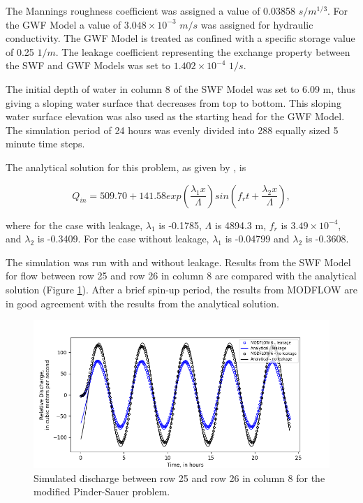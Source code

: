 \documentclass[fleqn]{article}
\begin{document}
The Mannings roughness coefficient was assigned a value of 0.03858 $s/m^{1/3}$.  For the GWF Model a value of $3.048 \times 10^{-3}$ $m/s$ was assigned for hydraulic conductivity. The GWF Model is treated as confined with a specific storage value of 0.25 $1/m$.  The leakage coefficient representing the exchange property between the SWF and GWF Models was set to $1.402 \times 10^{-4}$ $1/s$.

The initial depth of water in column 8 of the SWF Model was set to 6.09 m, thus giving a sloping water surface that decreases from top to bottom.  This sloping water surface elevation was also used as the starting head for the GWF Model.  The simulation period of 24 hours was evenly divided into 288 equally sized 5 minute time steps.  

The analytical solution for this problem, as given by \cite{lal2001}, is

\begin{equation}
  Q_{in} = 509.70 + 141.58 
  exp \left ( \frac{\lambda_1 x}{\Lambda} \right ) 
  sin \left ( f_r t + \frac{\lambda_2 x}{\Lambda}\right ),
\end{equation}

\noindent where for the case with leakage, $\lambda_1$ is -0.1785, $\Lambda$ is 4894.3 m, $f_r$ is $3.49 \times 10^{-4}$, and $\lambda_2$ is -0.3409.  For the case without leakage, $\lambda_1$ is -0.04799 and $\lambda_2$ is -0.3608.

The simulation was run with and without leakage.  Results from the SWF Model for flow between row 25 and row 26 in column 8 are compared with the analytical solution (Figure \ref{fig:pinder-sauer}). After a brief spin-up period, the results from MODFLOW are in good agreement with the results from the analytical solution.

\begin{figure}
	\centering
	\includegraphics[scale=0.50]{figures/pinder-sauer-results.png}
	\caption[Simulated discharge between row 25 and row 26 in column 8 for the modified Pinder-Sauer problem.]{Simulated discharge between row 25 and row 26 in column 8 for the modified Pinder-Sauer problem.}
	\label{fig:pinder-sauer}
\end{figure}


% 

 
\end{document}

